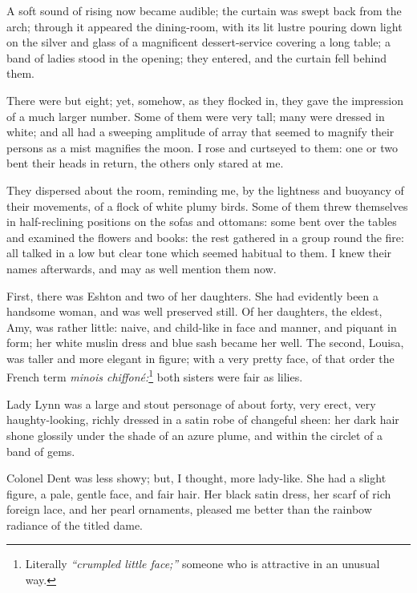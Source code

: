 A soft sound of rising now became audible; the curtain was swept back
from the arch; through it appeared the dining-room, with its lit lustre
pouring down light on the silver and glass of a magnificent
dessert-service covering a long table; a band of ladies stood in the
opening; they entered, and the curtain fell behind them.

There were but eight; yet, somehow, as they flocked in, they gave the
impression of a much larger number. Some of them were very tall; many
were dressed in white; and all had a sweeping amplitude of array that
seemed to magnify their persons as a mist magnifies the moon. I rose
and curtseyed to them: one or two bent their heads in return, the others
only stared at me.

They dispersed about the room, reminding me, by the lightness and
buoyancy of their movements, of a flock of white plumy birds. Some of
them threw themselves in half-reclining positions on the sofas and
ottomans: some bent over the tables and examined the flowers and books:
the rest gathered in a group round the fire: all talked in a low but
clear tone which seemed habitual to them. I knew their names
afterwards, and may as well mention them now.

First, there was \Mrs{} Eshton and two of her daughters. She had
evidently been a handsome woman, and was well preserved still. Of her
daughters, the eldest, Amy, was rather little: naive, and child-like in
face and manner, and piquant in form; her white muslin dress and blue
sash became her well. The second, Louisa, was taller and more elegant
in figure; with a very pretty face, of that order the French term
\foreignlanguage{french}{\emph{minois chiffoné:}}\footnote{
	Literally \emph{\enquote{crumpled little face;}} someone who is attractive in an unusual way.} both sisters were fair as lilies. %

Lady Lynn was a large and stout personage of about forty, very erect,
very haughty-looking, richly dressed in a satin robe of changeful sheen:
her dark hair shone glossily under the shade of an azure plume, and
within the circlet of a band of gems.

\Mrs{} Colonel Dent was less showy; but, I thought, more lady-like. She
had a slight figure, a pale, gentle face, and fair hair. Her black
satin dress, her scarf of rich foreign lace, and her pearl ornaments,
pleased me better than the rainbow radiance of the titled dame.

